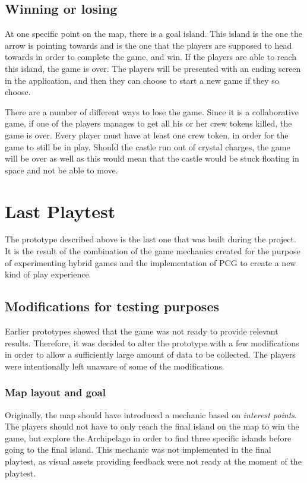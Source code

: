 \subsection{Winning or losing}
At one specific point on the map, there is a goal island. This island is the one the arrow is pointing towards and is the one that the players are supposed to head towards in order to complete the game, and win.
If the players are able to reach this island, the game is over. The players will be presented with an ending screen in the application, and then they can choose to start a new game if they so choose. 

There are a number of different ways to lose the game. Since it is a collaborative game, if one of the players manages to get all his or her crew tokens killed, the game is over. Every player must have at least one crew token, in order for the game to still be in play.
Should the castle run out of crystal charges, the game will be over as well as this would mean that the castle would be stuck floating in space and not be able to move.

\section{Last Playtest}
The prototype described above is the last one that was built during the project. It is the result of the combination of the game mechanics created for the purpose of experimenting hybrid games and the implementation of PCG to create a new kind of play experience.
\subsection{Modifications for testing purposes}
Earlier prototypes showed that the game was not ready to provide relevant results. Therefore, it was decided to alter the prototype with a few modifications in order to allow a sufficiently large amount of data to be collected. The players were intentionally left unaware of some of the modifications.

\subsubsection{Map layout and goal}
Originally, the map should have introduced a mechanic based on \textit{interest points}. The players should not have to only reach the final island on the map to win the game, but explore the Archipelago in order to find three specific islands before going to the final island. This mechanic was not implemented in the final playtest, as visual assets providing feedback were not ready at the moment of the playtest.

